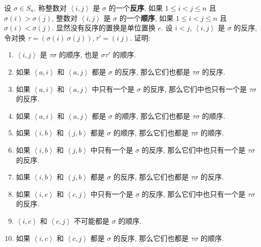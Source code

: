 \documentclass[color=black,device=normal,lang=cn,mode=geye]{elegantnote}
\begin{document}
\begin{exercisec}[2.3.4]\label{ex2.3.4}
    设 $\sigma\in S_n$. 称整数对 $\left<i,j\right>$ 是 $\sigma$ 的一个\textbf{反序}, 如果 $1\leq i<j\leq n$ 且 $\sigma(i)>\sigma(j)$, 整数对 $\left<i,j\right>$ 是 $\sigma$ 的一个\textbf{顺序}, 如果 $1\leq i<j\leq n$ 且 $\sigma(i)<\sigma(j)$. 显然没有反序的置换是单位置换 $e$. 设 $i<j$, $\left<i,j\right>$ 是 $\sigma$ 的反序, 令对换 $\tau=(\sigma(i)\ \sigma(j)),\tau'=(i\ j)$. 证明:
    \begin{enumerate}
        \def\labelenumi{(\arabic{enumi})}
        \item $\left<i,j\right>$ 是 $\tau\sigma$ 的顺序, 也是 $\sigma\tau'$ 的顺序.
        \item 如果 $\left<a,i\right>$ 和 $\left<a,j\right>$ 都是 $\sigma$ 的反序, 那么它们也都是 $\tau\sigma$ 的反序.
        \item 如果 $\left<a,i\right>$ 和 $\left<a,j\right>$ 中只有一个是 $\sigma$ 的反序, 那么它们中也只有一个是 $\tau\sigma$ 的反序.
        \item 如果 $\left<a,i\right>$ 和 $\left<a,j\right>$ 都是 $\sigma$ 的顺序, 那么它们也都是 $\tau\sigma$ 的顺序.
        \item 如果 $\left<i,b\right>$ 和 $\left<j,b\right>$ 都是 $\sigma$ 的顺序, 那么它们也都是 $\tau\sigma$ 的顺序.
        \item 如果 $\left<i,b\right>$ 和 $\left<j,b\right>$ 中只有一个是 $\sigma$ 的反序, 那么它们中也只有一个是 $\tau\sigma$ 的反序.
        \item 如果 $\left<i,b\right>$ 和 $\left<j,b\right>$ 都是 $\sigma$ 的反序, 那么它们也都是 $\tau\sigma$ 的反序.
        \item 如果 $\left<i,c\right>$ 和 $\left<c,j\right>$ 中只有一个是 $\sigma$ 的反序, 那么它们中也只有一个是 $\tau\sigma$ 的反序.
        \item $\left<i,c\right>$ 和 $\left<c,j\right>$ 不可能都是 $\sigma$ 的顺序.
        \item 如果 $\left<i,c\right>$ 和 $\left<c,j\right>$ 都是 $\sigma$ 的反序, 那么它们也都是 $\tau\sigma$ 的顺序.
    \end{enumerate}
\end{exercisec}
\end{document}

